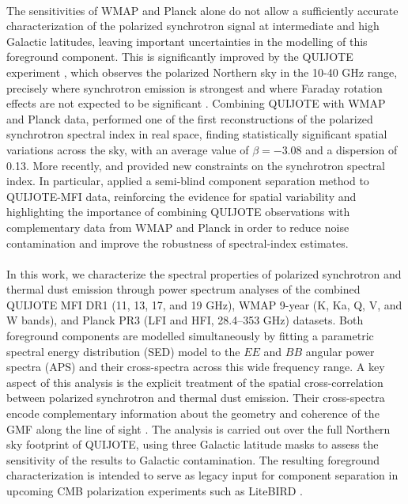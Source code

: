 \paragraph{}

The sensitivities of WMAP and Planck alone do not allow a sufficiently accurate characterization of the polarized synchrotron signal at intermediate and high Galactic latitudes, leaving important uncertainties in the modelling of this foreground component. This is significantly improved by the QUIJOTE experiment \citep{QUIJOTE_IV}, which observes the polarized Northern sky in the 10-40 GHz range, precisely where synchrotron emission is strongest and where Faraday rotation effects are not expected to be significant \citep{faraday_rotations}. Combining QUIJOTE with WMAP and Planck data, \cite{QUIJOTE_VIII} performed one of the first reconstructions of the polarized synchrotron spectral index in real space, finding statistically significant spatial variations across the sky, with an average value of $\beta = -3.08$ and a dispersion of 0.13. More recently, \cite{casas_2025} and \citet{QUIJOTE_XIX} provided new constraints on the synchrotron spectral index. In particular, \citet{QUIJOTE_XIX} applied a semi-blind component separation method to QUIJOTE-MFI data, reinforcing the evidence for spatial variability and highlighting the importance of combining QUIJOTE observations with complementary data from WMAP and Planck in order to reduce noise contamination and improve the robustness of spectral-index estimates.

\paragraph{}

In this work, we characterize the spectral properties of polarized synchrotron and thermal dust emission through power spectrum analyses of the combined QUIJOTE MFI DR1 (11, 13, 17, and 19 GHz), WMAP 9-year (K, Ka, Q, V, and W bands), and Planck PR3 (LFI and HFI, 28.4--353 GHz) datasets. Both foreground components are modelled simultaneously by fitting a parametric spectral energy distribution (SED) model to the $EE$ and $BB$ angular power spectra (APS) and their cross-spectra across this wide frequency range. A key aspect of this analysis is the explicit treatment of the spatial cross-correlation between polarized synchrotron and thermal dust emission. Their cross-spectra encode complementary information about the geometry and coherence of the GMF along the line of sight \citep{Planck_XXII, Choi_2015}. The analysis is carried out over the full Northern sky footprint of QUIJOTE, using three Galactic latitude masks to assess the sensitivity of the results to Galactic contamination. The resulting foreground characterization is intended to serve as legacy input for component separation in upcoming CMB polarization experiments such as LiteBIRD \citep{LiteBIRD}.